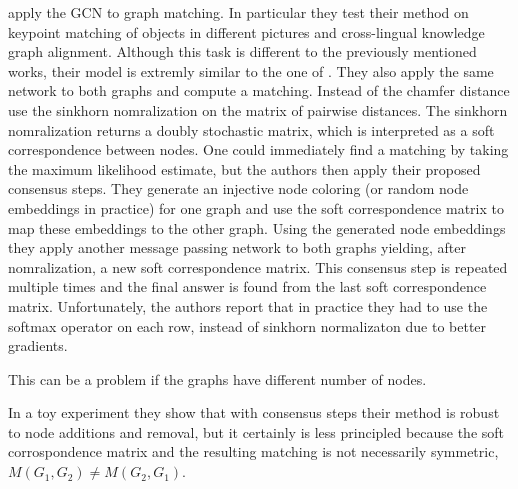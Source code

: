 \cite{fey2020_update} apply the GCN to graph matching. %
In particular they test their method on keypoint matching of objects in different pictures and cross-lingual knowledge graph alignment. Although this task is different to the previously mentioned works, their model is extremly similar to the one of \cite{riba2018}. They also apply the same network to both graphs and compute a matching. Instead of the chamfer distance \cite{fey2020_update} use the sinkhorn nomralization \cite{sinkhorn2013} on the matrix of pairwise distances. The sinkhorn nomralization returns a doubly stochastic matrix, which is interpreted as a soft correspondence between nodes. One could immediately find a matching by taking the maximum likelihood estimate, but the authors then apply their proposed consensus steps. They generate an injective node coloring (or random node embeddings in practice) for one graph and use the soft correspondence matrix to map these embeddings to the other graph. Using the generated node embeddings they apply another message passing network to both graphs yielding, after nomralization, a new soft correspondence matrix. This consensus step is repeated multiple times and the final answer is found from the last soft correspondence matrix. Unfortunately, the authors report that in practice they had to use the softmax operator on each row, instead of sinkhorn normalizaton due to better gradients.

This can be a problem if the graphs have different number of nodes. %

In a toy experiment they show that with consensus steps their method is robust to node additions and removal, but it certainly is less principled because the soft corrospondence matrix and the resulting matching is not necessarily symmetric, $M(G_1, G_2) \neq M(G_2, G_1)$.





